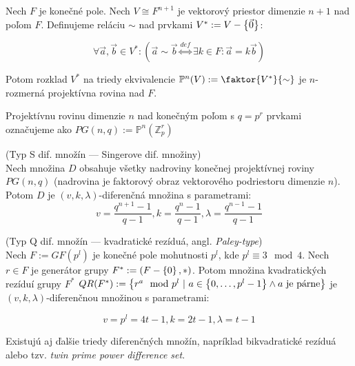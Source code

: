 \begin{definition}
\label{def:fpp1}
Nech $F$ je konečné pole. Nech $V \cong F^{n+1}$ je vektorový priestor dimenzie $n+1$ nad poľom $F$. 
Definujeme reláciu $\sim$ nad prvkami $V^* := V - \left\{\vec{0}\right\}$:

$$\forall \vec{a},\vec{b} \in V^*: \left( \vec{a} \sim \vec{b} \overset{def}{\Longleftrightarrow} \exists k \in F: \vec{a} = k \vec{b} \right)$$

Potom rozklad $V^*$ na triedy ekvivalencie $\mathbb{P}^n(V) := \faktor{V^*}{\sim}$ je $n$-rozmerná projektívna rovina nad $F$.

Projektívnu rovinu dimenzie $n$ nad konečným poľom s $q = p^r$ prvkami označujeme ako $PG(n, q) := \mathbb{P}^n\left( \mathbb{Z}_p^r \right)$

\end{definition}

\begin{theorem_hard}{(Typ S dif. množín --- Singerove dif. množiny)}\\
Nech množina $D$ obsahuje všetky nadroviny konečnej projektívnej roviny $PG(n, q)$ 
(nadrovina je faktorový obraz vektorového podriestoru dimenzie $n$). 
Potom $D$ je $(v, k, \lambda)$-diferenčná množina s parametrami:
$$v = \dfrac{q^{n+1}-1}{q-1}, k = \dfrac{q^n - 1}{q-1}, \lambda = \dfrac{q^{n-1}-1}{q-1}$$
\end{theorem_hard}

\begin{theorem_hard}{(Typ Q dif. množín --- kvadratické rezíduá, angl. \emph{Paley-type})}\\
Nech $F := GF(p^l)$ je konečné pole mohutnosti $p^l$, kde $p^l \equiv 3 \mod 4$. 
Nech $r \in F$ je generátor grupy $F^\ast := (F-\left\{0\right\}, \ast)$. 
Potom množina kvadratických rezíduí grupy $F^*$ $QR(F^*) := \left\{r^a \mod p^l ~|~ a \in \left\{0, \ldots, p^l-1\right\} \wedge a~\text{je párne} \right\}$
je $(v, k, \lambda)$-diferenčnou množinou s parametrami:

$$v = p^l = 4t-1, k = 2t - 1, \lambda = t-1$$

\end{theorem_hard}

\begin{remark}

Existujú aj ďalšie triedy diferenčných množín, napríklad bikvadratické rezíduá alebo tzv. \emph{twin prime power difference set}.

\end{remark}
\begin{toreview}

\end{toreview}


